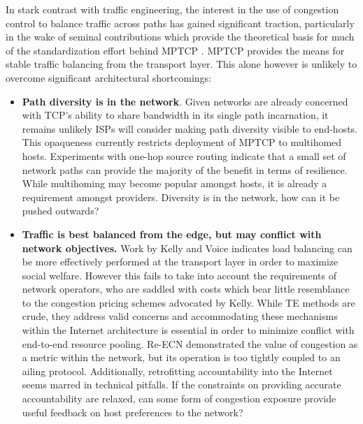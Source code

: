 In stark contrast with traffic engineering, the interest in the use of congestion control to balance traffic across paths has gained significant traction, particularly in the wake of seminal contributions \cite{Key:2007p130,Kelly:2005p140} which provide the theoretical basis for much of the standardization effort behind \ac{MPTCP} \cite{Wischik:2008p137}. 
\ac{MPTCP} provides the means for stable traffic balancing from the transport layer.
This alone however is unlikely to overcome significant architectural shortcomings:

\begin{itemize}
\item{
    \textbf{Path diversity is in the network}. 
    Given networks are already concerned with \ac{TCP}'s ability to share bandwidth in its single path incarnation, it remains unlikely \acp{ISP} will consider making path diversity visible to end-hosts. 
    This opaqueness currently restricts deployment of \ac{MPTCP} to multihomed hosts. 
    Experiments with one-hop source routing \cite{Gummadi:2004p131} indicate that a small set of network paths can provide the majority of the benefit in terms of resilience. 
    While multihoming may become popular amongst hosts, it is already a requirement amongst providers. 
    Diversity is in the network, how can it be pushed outwards?
}

\item{
    \textbf{Traffic is best balanced from the edge, but may conflict with network objectives.}
    Work by Kelly and Voice \cite{Kelly:2005p140} indicates load balancing can be more effectively performed at the transport layer in order to maximize social welfare.
    However this fails to take into account the requirements of network operators, who are saddled with costs which bear little resemblance to the congestion pricing schemes advocated by Kelly.
    While \ac{TE} methods are crude, they address valid concerns and accommodating these mechanisms within the Internet architecture is essential in order to minimize conflict with end-to-end resource pooling. 
    Re-\ac{ECN} \cite{Briscoe:2008p494} demonstrated the value of congestion as a metric within the network, but its operation is too tightly coupled to an ailing protocol. 
    Additionally, retrofitting accountability into the Internet seems marred in technical pitfalls.
    If the constraints on providing accurate accountability are relaxed, can some form of congestion exposure provide useful feedback on host preferences to the network?
}


\end{itemize}
